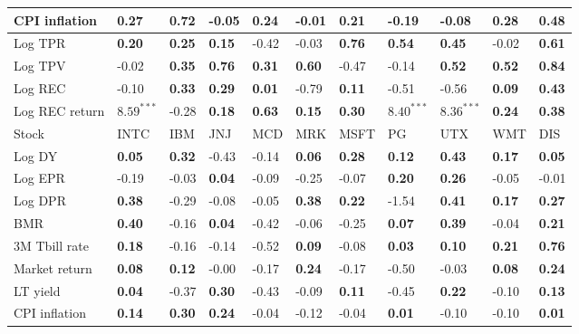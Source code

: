 \begin{table}[h!]
{\begin{center}
\begin{tabularx}{1\textwidth}{@{}X@{\hspace{0.2cm}}l@{\hspace{0.2cm}}l@{\hspace{0.2cm}}l@{\hspace{0.2cm}}l@{\hspace{0.2cm}}l@{\hspace{0.2cm}}l@{\hspace{0.2cm}}l@{\hspace{0.2cm}}l@{\hspace{0.2cm}}l@{\hspace{0.2cm}}l@{}}
 CPI inflation  & \textbf{0.27}	 & \textbf{0.72}	 & -0.05	 & \textbf{0.24}	 & -0.01	 & \textbf{0.21}	 & -0.19	 & -0.08	 & \textbf{0.28}	 & \textbf{0.48}	\\
\midrule
 Log TPR  & \textbf{0.20}	 & \textbf{0.25}	 & \textbf{0.15}	 & -0.42	 & -0.03	 & \textbf{0.76}	 & \textbf{0.54}	 & \textbf{0.45}	 & -0.02	 & \textbf{0.61}	\\
 Log TPV  & -0.02	 & \textbf{0.35}	 & \textbf{0.76}	 & \textbf{0.31}	 & \textbf{0.60}	 & -0.47	 & -0.14	 & \textbf{0.52}	 & \textbf{0.52}	 & \textbf{0.84}	\\
 Log REC  & -0.10	 & \textbf{0.33}	 & \textbf{0.29}	 & \textbf{0.01}	 & -0.79	 & \textbf{0.11}	 & -0.51	 & -0.56	 & \textbf{0.09}	 & \textbf{0.43}	\\
 Log REC return  & $\mathbf{8.59^{***}}$	 & -0.28	 & \textbf{0.18}	 & \textbf{0.63}	 & \textbf{0.15}	 & \textbf{0.30}	 & $\mathbf{8.40^{***}}$	 & $\mathbf{8.36^{***}}$	 & \textbf{0.24}	 & \textbf{0.38}	\\
\midrule
\midrule
 Stock  & INTC	 & IBM	 & JNJ	 & MCD	 & MRK	 & MSFT	 & PG	 & UTX	 & WMT	 & DIS	\\
\midrule
 Log DY  & \textbf{0.05}	 & \textbf{0.32}	 & -0.43	 & -0.14	 & \textbf{0.06}	 & \textbf{0.28}	 & \textbf{0.12}	 & \textbf{0.43}	 & \textbf{0.17}	 & \textbf{0.05}	\\
 Log EPR  & -0.19	 & -0.03	 & \textbf{0.04}	 & -0.09	 & -0.25	 & -0.07	 & \textbf{0.20}	 & \textbf{0.26}	 & -0.05	 & -0.01	\\
 Log DPR  & \textbf{0.38}	 & -0.29	 & -0.08	 & -0.05	 & \textbf{0.38}	 & \textbf{0.22}	 & -1.54	 & \textbf{0.41}	 & \textbf{0.17}	 & \textbf{0.27}	\\
 BMR  & \textbf{0.40}	 & -0.16	 & \textbf{0.04}	 & -0.42	 & -0.06	 & -0.25	 & \textbf{0.07}	 & \textbf{0.39}	 & -0.04	 & \textbf{0.21}	\\
\midrule
 3M Tbill rate  & \textbf{0.18}	 & -0.16	 & -0.14	 & -0.52	 & \textbf{0.09}	 & -0.08	 & \textbf{0.03}	 & \textbf{0.10}	 & \textbf{0.21}	 & \textbf{0.76}	\\
 Market return  & \textbf{0.08}	 & \textbf{0.12}	 & -0.00	 & -0.17	 & \textbf{0.24}	 & -0.17	 & -0.50	 & -0.03	 & \textbf{0.08}	 & \textbf{0.24}	\\
 LT yield  & \textbf{0.04}	 & -0.37	 & \textbf{0.30}	 & -0.43	 & -0.09	 & \textbf{0.11}	 & -0.45	 & \textbf{0.22}	 & -0.10	 & \textbf{0.13}	\\
 CPI inflation  & \textbf{0.14}	 & \textbf{0.30}	 & \textbf{0.24}	 & -0.04	 & -0.12	 & -0.04	 & \textbf{0.01}	 & -0.10	 & -0.10	 & \textbf{0.01}	\\

\end{tabularx}
\end{center}}
\end{table}

